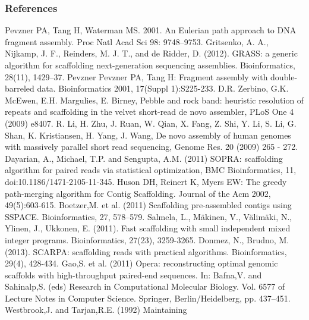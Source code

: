 \documentclass[compress]{beamer}
\begin{document}
  \begin{frame}[allowframebreaks]
    \frametitle{References}
    \tiny

    \begin{thebibliography}{widest entry}
       Pevzner PA, Tang H, Waterman MS. 2001. An
        Eulerian path approach to DNA fragment assembly. Proc Natl Acad Sci 98:
        9748–9753.
       Gritsenko, A. A., Nijkamp, J. F., Reinders, M. J. T.,
        and de Ridder, D. (2012). GRASS: a generic algorithm for scaffolding
        next-generation sequencing assemblies. Bioinformatics, 28(11), 1429–37.
       Pevzner Pevzner PA, Tang H: Fragment assembly with
        double-barreled data. Bioinformatics 2001, 17(Suppl 1):S225-233.
       D.R. Zerbino, G.K. McEwen, E.H. Margulies, E.
        Birney, Pebble and rock band: heuristic resolution of repeats and
        scaffolding in the velvet short-read de novo assembler, PLoS One 4 (2009)
        e8407.
       R. Li, H. Zhu, J. Ruan, W. Qian, X. Fang, Z. Shi, Y. Li,
        S. Li, G. Shan, K. Kristiansen, H. Yang, J. Wang, De novo assembly of
        human genomes with massively parallel short read sequencing, Genome Res. 20
        (2009) 265 - 272.
       Dayarian, A., Michael, T.P. and Sengupta, A.M. (2011) SOPRA:
        scaffolding algorithm for paired reads via statistical optimization, BMC
        Bioinformatics, 11, doi:10.1186/1471-2105-11-345.
       Huson DH, Reinert K, Myers EW: The greedy
        path-merging algorithm for Contig Scaffolding. Journal of the Acm 2002,
        49(5):603-615.
       Boetzer,M. et al. (2011) Scaffolding pre-assembled contigs
        using SSPACE. Bioinformatics, 27, 578–579.
       Salmela, L., Mäkinen, V., Välimäki, N., Ylinen, J., Ukkonen,
        E. (2011). Fast scaffolding with small independent mixed integer programs.
        Bioinformatics, 27(23), 3259-3265.
       Donmez, N., Brudno, M. (2013). SCARPA: scaffolding reads
        with practical algorithms. Bioinformatics, 29(4), 428-434.
       Gao,S. et al. (2011) Opera: reconstructing optimal genomic
        scaffolds with high-throughput paired-end sequences. In: Bafna,V. and
        Sahinalp,S. (eds) Research in Computational Molecular Biology. Vol. 6577 of
        Lecture Notes in Computer Science. Springer, Berlin/Heidelberg, pp. 437–451.
       Westbrook,J. and Tarjan,R.E. (1992) Maintaining

\end{thebibliography}
\end{frame}
\end{document}
